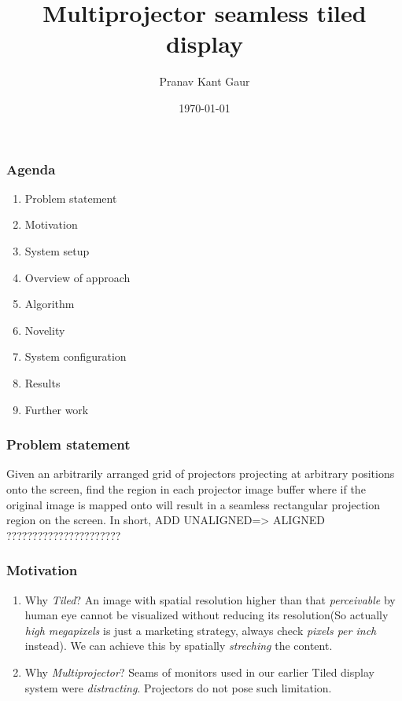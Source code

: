 \documentclass{beamer}
\title{Multiprojector seamless tiled display}
\author{Pranav Kant Gaur}
\institute{Graphics and Visualization section}
\date{\today}
\begin{document}
\begin{frame}
\titlepage
\end{frame}

\begin{frame}
\frametitle{Agenda}
\begin{enumerate}
\item Problem statement
\item Motivation
\item System setup
\item Overview of approach
\item Algorithm 
\item Novelity
\item System configuration
\item Results
\item Further work
\end{enumerate}
\end{frame}

\begin{frame}
\frametitle{Problem statement}
Given an arbitrarily arranged grid of projectors projecting at arbitrary positions onto the screen, find the region in each projector image buffer where if the original image is mapped onto will result in a seamless rectangular projection region on the screen.\newline
In short, 
ADD UNALIGNED=> ALIGNED ??????????????????????
\end{frame}

\begin{frame}
\frametitle{Motivation}
\begin{enumerate}
\item Why \textit{Tiled}?\newline
An image with spatial resolution higher than that \textit{perceivable} by human eye cannot be visualized without reducing its resolution(So actually \textit{high megapixels} is just a marketing strategy, always check \textit{pixels per inch} instead). We can achieve this by spatially \textit{streching} the content.
\item Why \textit{Multiprojector}?\newline
Seams of monitors used in our earlier Tiled display system were \textit{distracting}. Projectors do not pose such limitation.
\end{enumerate}
\end{frame}
\end{document}
